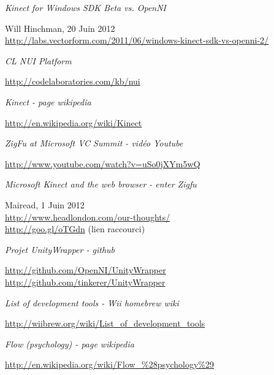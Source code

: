 \begin{thebibliography}{9}
  \emph{Kinect for Windows SDK Beta vs. OpenNI}\\
  \begin{small}
  Will Hinchman, 20 Juin 2012\\
  \url{http://labs.vectorform.com/2011/06/windows-kinect-sdk-vs-openni-2/}
  \end{small}
  
  \emph{CL NUI Platform}\\
  \begin{small}
  \url{http://codelaboratories.com/kb/nui}
  \end{small}
  
  \emph{Kinect - page wikipedia}\\
  \begin{small}
  \url{http://en.wikipedia.org/wiki/Kinect}
  \end{small}
  
  \emph{ZigFu at Microsoft VC Summit - vidéo Youtube}\\
  \begin{small}
  \url{http://www.youtube.com/watch?v=uSo0jXYm5wQ}
  \end{small}
  
  \emph{Microsoft Kinect and the web browser - enter Zigfu}\\
  \begin{small}
  Mairead, 1 Juin 2012\\
  \url{http://www.headlondon.com/our-thoughts/}\\
  \url{http://goo.gl/oTGdn} (lien raccourci)
  \end{small}
  
  \emph{Projet UnityWrapper - github}\\
  \begin{small}
  \url{http://github.com/OpenNI/UnityWrapper}\\
  \url{http://github.com/tinkerer/UnityWrapper}
  \end{small}
  
  \emph{List of development tools - Wii homebrew wiki}\\
  \begin{small}
  \url{http://wiibrew.org/wiki/List_of_development_tools}
  \end{small}
  
  \emph{Flow (psychology) - page wikipedia}\\
  \begin{small}
  \url{http://en.wikipedia.org/wiki/Flow_\%28psychology\%29}
  \end{small}
  

\end{thebibliography}
